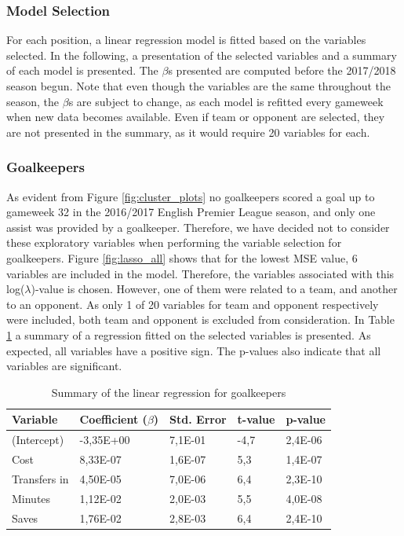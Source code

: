 \subsubsection{Model Selection}
For each position, a linear regression model is fitted based on the variables selected. In the following, a presentation of the selected variables and a summary of each model is presented. The $\beta$s presented are computed before the 2017/2018 season begun. Note that even though the variables are the same throughout the season, the $\beta$s are subject to change, as each model is refitted every gameweek when new data becomes available. Even if team or opponent are selected, they are not presented in the summary, as it would require 20 variables for each.

\newpar

\subsubsection{Goalkeepers}
As evident from Figure \ref{fig:cluster_plots} no goalkeepers scored a goal up to gameweek 32 in the 2016/2017 English Premier League season, and only one assist was provided by a goalkeeper. Therefore, we have decided not to consider these exploratory variables when performing the variable selection for goalkeepers. Figure \ref{fig:lasso_all} shows that for the lowest MSE value, 6 variables are included in the model. Therefore, the variables associated with this log($\lambda$)-value is chosen. However, one of them were related to a team, and another to an opponent. As only 1 of 20 variables for team and opponent respectively were included, both team and opponent is excluded from consideration. In Table \ref{tab:coef_GLK} a summary of a regression fitted on the selected variables is presented. As expected, all variables have a positive sign. The p-values also indicate that all variables are significant. 

\begin{table}[H]
\centering
\begin{tabular}{|l|l|l|l|l|}
\hline
Variable     & Coefficient ($\beta$) & Std. Error & t-value & p-value \\ \hline
(Intercept)  & -3,35E+00    & 7,1E-01    & -4,7    & 2,4E-06               \\
Cost         & 8,33E-07 & 1,6E-07    & 5,3     & 1,4E-07               \\
Transfers in & 4,50E-05 & 7,0E-06    & 6,4     & 2,3E-10               \\
Minutes      & 1,12E-02 & 2,0E-03    & 5,5     & 4,0E-08               \\
Saves        & 1,76E-02 & 2,8E-03    & 6,4     & 2,4E-10
\\
\hline
\end{tabular}
\caption{Summary of the linear regression for goalkeepers}
\label{tab:coef_GLK}
\end{table}

